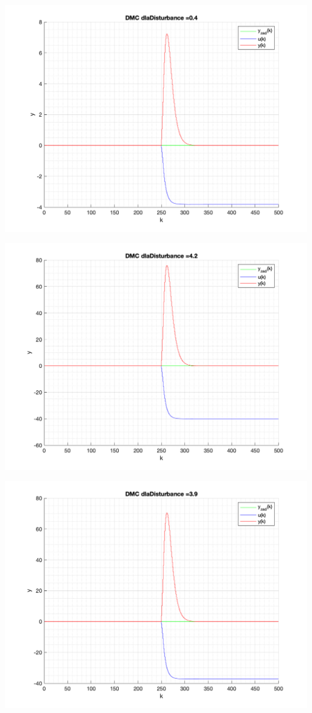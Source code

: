 \documentclass[a4paper, 11pt]{article}
\begin{document}
\begin{enumerate}
 \includegraphics[width=\linewidth]{./ModelsP4_Disturbance/P4_DMC_Disturbance_0_4_png.png} 
 
 \includegraphics[width=\linewidth]{./ModelsP4_Disturbance/P4_DMC_Disturbance_4_2_png.png} 
 
 \includegraphics[width=\linewidth]{./ModelsP4_Disturbance/P4_DMC_Disturbance_3_9_png.png} 
 

\end{enumerate}
\end{document}

